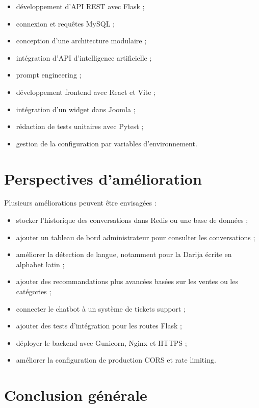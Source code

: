 \documentclass[12pt,a4paper]{report}
\begin{document}
\begin{itemize}
    \item développement d'API REST avec Flask ;
    \item connexion et requêtes MySQL ;
    \item conception d'une architecture modulaire ;
    \item intégration d'API d'intelligence artificielle ;
    \item prompt engineering ;
    \item développement frontend avec React et Vite ;
    \item intégration d'un widget dans Joomla ;
    \item rédaction de tests unitaires avec Pytest ;
    \item gestion de la configuration par variables d'environnement.
\end{itemize}

\chapter{Perspectives d'amélioration}

Plusieurs améliorations peuvent être envisagées :

\begin{itemize}
    \item stocker l'historique des conversations dans Redis ou une base de données ;
    \item ajouter un tableau de bord administrateur pour consulter les conversations ;
    \item améliorer la détection de langue, notamment pour la Darija écrite en alphabet latin ;
    \item ajouter des recommandations plus avancées basées sur les ventes ou les catégories ;
    \item connecter le chatbot à un système de tickets support ;
    \item ajouter des tests d'intégration pour les routes Flask ;
    \item déployer le backend avec Gunicorn, Nginx et HTTPS ;
    \item améliorer la configuration de production CORS et rate limiting.
\end{itemize}

\chapter{Conclusion générale}
\end{document}
